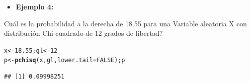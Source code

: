 \documentclass[12pt,letterpaper]{article}\usepackage[]{graphicx}\usepackage[]{color}
\makeatletter
\newcommand{\hlnum}[1]{\textcolor[rgb]{0.686,0.059,0.569}{#1}}%
\newcommand{\hlstd}[1]{\textcolor[rgb]{0.345,0.345,0.345}{#1}}%
\newcommand{\hlkwb}[1]{\textcolor[rgb]{0.69,0.353,0.396}{#1}}%
\newcommand{\hlkwc}[1]{\textcolor[rgb]{0.333,0.667,0.333}{#1}}%
\newcommand{\hlkwd}[1]{\textcolor[rgb]{0.737,0.353,0.396}{\textbf{#1}}}%
\newenvironment{kframe}{%
 \def\at@end@of@kframe{}%
 \ifinner\ifhmode%
  \def\at@end@of@kframe{\end{minipage}}%
  \begin{minipage}{\columnwidth}%
 \fi\fi%
 \def\FrameCommand##1{\hskip\@totalleftmargin \hskip-\fboxsep
 \colorbox{shadecolor}{##1}\hskip-\fboxsep
     \hskip-\linewidth \hskip-\@totalleftmargin \hskip\columnwidth}%
 \MakeFramed {\advance\hsize-\width
   \@totalleftmargin\z@ \linewidth\hsize
   \@setminipage}}%
 {\par\unskip\endMakeFramed%
 \at@end@of@kframe}
\newenvironment{knitrout}{}{} %
\makeatother
\begin{document}
\begin{itemize}
  \item \textbf{Ejemplo 4:}
\end{itemize}
Cu\'al es la probabilidad a la derecha de 18.55 para una Variable aleatoria X con 
distribuci\'on Chi-cuadrado de 12 grados de libertad?
\begin{knitrout}
\color{fgcolor}\begin{kframe}
\begin{alltt}
\hlstd{x} \hlkwb{<-} \hlnum{18.55}\hlstd{; gl} \hlkwb{<-} \hlnum{12}
\hlstd{p} \hlkwb{<-} \hlkwd{pchisq}\hlstd{(x, gl,} \hlkwc{lower.tail} \hlstd{=} \hlnum{FALSE}\hlstd{); p}
\end{alltt}
\begin{verbatim}
## [1] 0.09998251
\end{verbatim}
\end{kframe}
\end{knitrout}
\end{document}
